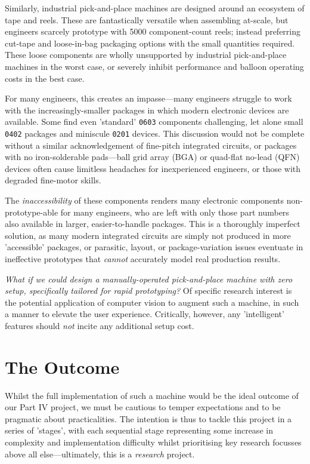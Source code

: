 \documentclass [11pt]{article}
\begin{document}
Similarly, industrial pick-and-place machines are designed around an ecosystem of tape and reels.
These are fantastically versatile when assembling at-scale, but engineers scarcely prototype with 5000 component-count reels; instead preferring cut-tape and loose-in-bag packaging options with the small quantities required.
These loose components are wholly unsupported by industrial pick-and-place machines in the worst case, or severely inhibit performance and balloon operating costs in the best case.

For many engineers, this creates an impasse—many engineers struggle to work with the increasingly-smaller packages in which modern electronic devices are available.
Some find even 'standard' \texttt{0603} components challenging, let alone small \texttt{0402} packages and miniscule \texttt{0201} devices.
This discussion would not be complete without a similar acknowledgement of fine-pitch integrated circuits, or packages with no iron-solderable pads—ball grid array (BGA) or quad-flat no-lead (QFN) devices often cause limitless headaches for inexperienced engineers, or those with degraded fine-motor skills.

The \emph{inaccessibility} of these components renders many electronic components non-prototype-able for many engineers, who are left with only those part numbers also available in larger, easier-to-handle packages.
This is a thoroughly imperfect solution, as many modern integrated circuits are simply not produced in more 'accessible' packages, or parasitic, layout, or package-variation issues eventuate in ineffective prototypes that \emph{cannot} accurately model real production results.

\emph{What if we could design a manually-operated pick-and-place machine with zero setup, specifically tailored for rapid prototyping?}
Of specific research interest is the potential application of computer vision to augment such a machine, in such a manner to elevate the user experience.
Critically, however, any 'intelligent' features should \emph{not} incite any additional setup cost.

\section{The Outcome}

Whilst the full implementation of such a machine would be the ideal outcome of our Part IV project, we must be cautious to temper expectations and to be pragmatic about practicalities.
The intention is thus to tackle this project in a series of 'stages', with each sequential stage representing some increase in complexity and implementation difficulty whilst prioritising key research focusses above all else—ultimately, this is a \emph{research} project.
\end{document}
